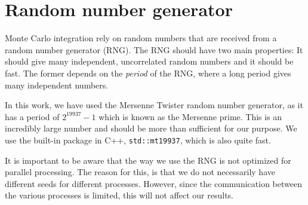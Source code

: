 \section{Random number generator}
Monte Carlo integration rely on random numbers that are received from a random number generator (RNG). The RNG should have two main properties: It should give many independent, uncorrelated random numbers and it should be fast. The former depends on the \textit{period} of the RNG, where a long period gives many independent numbers. 

In this work, we have used the Mersenne Twister random number generator, as it has a period of $2^{19937}-1$ which is known as the Mersenne prime. This is an incredibly large number and should be more than sufficient for our purpose. We use the built-in package in C++, \lstinline|std::mt19937|, which is also quite fast. 

It is important to be aware that the way we use the RNG is not optimized for parallel processing. The reason for this, is that we do not necessarily have different seeds for different processes. However, since the communication between the various processes is limited, this will not affect our results. 